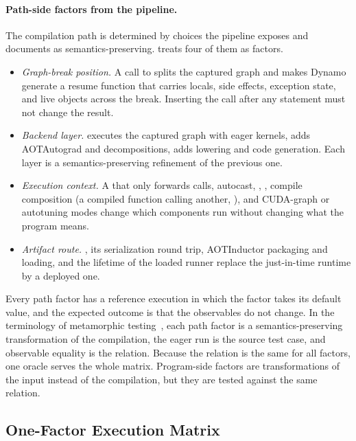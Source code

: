 \paragraph{Path-side factors from the pipeline.} The compilation path is determined by choices the pipeline
exposes and documents as semantics-preserving. \tool treats four of them as factors.
\begin{itemize}
  \item \emph{Graph-break position.} A call to  splits the captured graph
        and makes Dynamo generate a resume function that carries locals, side effects, exception state, and
        live objects across the break. Inserting the call after any statement must not change the result.
  \item \emph{Backend layer.}  executes the captured graph with eager kernels,
         adds AOTAutograd and decompositions,  adds lowering and code
        generation. Each layer is a semantics-preserving refinement of the previous one.
  \item \emph{Execution context.} A  that only forwards calls, autocast, ,
        , compile composition (a compiled function calling another, ),
        and CUDA-graph or autotuning modes change which components run without changing what the program
        means.
  \item \emph{Artifact route.} , its serialization round trip, AOTInductor packaging and
        loading, and the lifetime of the loaded runner replace the just-in-time runtime by a deployed one.
\end{itemize}
Every path factor has a reference execution in which the factor takes its default value, and the expected
outcome is that the observables do not change. In the terminology of metamorphic testing~\cite{DBLP:journals/csur/ChenKLPTTZ18,DBLP:journals/tse/SeguraFSC16},
each path factor is a semantics-preserving transformation of the compilation, the eager run is the source
test case, and observable equality is the relation. Because the relation is the same for all factors, one
oracle serves the whole matrix. Program-side factors are transformations of the input instead of
the compilation, but they are tested against the same relation.

\subsection{One-Factor Execution Matrix}
\label{sec:matrix}

